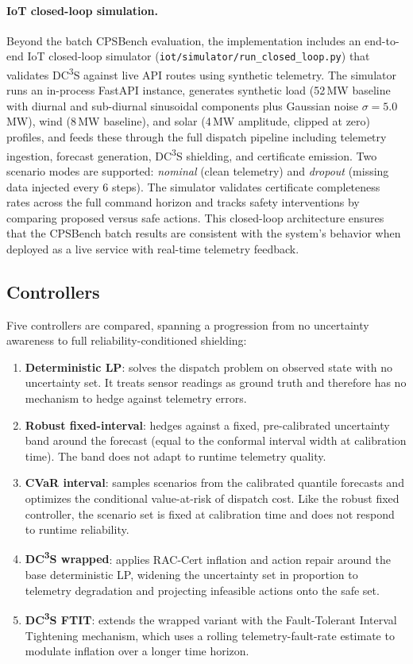 \documentclass[11pt,a4paper]{article}
\begin{document}
\paragraph{IoT closed-loop simulation.}
Beyond the batch CPSBench evaluation, the implementation includes an end-to-end IoT closed-loop simulator (\texttt{iot/simulator/run\_closed\_loop.py}) that validates DC\textsuperscript{3}S against live API routes using synthetic telemetry. The simulator runs an in-process FastAPI instance, generates synthetic load (52\,MW baseline with diurnal and sub-diurnal sinusoidal components plus Gaussian noise $\sigma=5.0$\,MW), wind (8\,MW baseline), and solar (4\,MW amplitude, clipped at zero) profiles, and feeds these through the full dispatch pipeline including telemetry ingestion, forecast generation, DC\textsuperscript{3}S shielding, and certificate emission. Two scenario modes are supported: \emph{nominal} (clean telemetry) and \emph{dropout} (missing data injected every 6 steps). The simulator validates certificate completeness rates across the full command horizon and tracks safety interventions by comparing proposed versus safe actions. This closed-loop architecture ensures that the CPSBench batch results are consistent with the system's behavior when deployed as a live service with real-time telemetry feedback.

\subsection{Controllers}

Five controllers are compared, spanning a progression from no uncertainty awareness to full reliability-conditioned shielding:
\begin{enumerate}[leftmargin=*,topsep=2pt,itemsep=1pt]
  \item \textbf{Deterministic LP}: solves the dispatch problem on observed state with no uncertainty set. It treats sensor readings as ground truth and therefore has no mechanism to hedge against telemetry errors.
  \item \textbf{Robust fixed-interval}: hedges against a fixed, pre-calibrated uncertainty band around the forecast (equal to the conformal interval width at calibration time). The band does not adapt to runtime telemetry quality.
  \item \textbf{CVaR interval}: samples scenarios from the calibrated quantile forecasts and optimizes the conditional value-at-risk of dispatch cost. Like the robust fixed controller, the scenario set is fixed at calibration time and does not respond to runtime reliability.
  \item \textbf{DC\textsuperscript{3}S wrapped}: applies RAC-Cert inflation and action repair around the base deterministic LP, widening the uncertainty set in proportion to telemetry degradation and projecting infeasible actions onto the safe set.
  \item \textbf{DC\textsuperscript{3}S FTIT}: extends the wrapped variant with the Fault-Tolerant Interval Tightening mechanism, which uses a rolling telemetry-fault-rate estimate to modulate inflation over a longer time horizon.
\end{enumerate}
\end{document}
